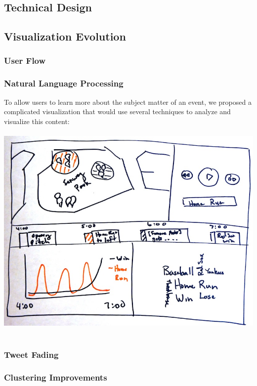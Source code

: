 \documentclass[pdftex,12pt,a4paper]{article}
\begin{document}
\subsection{Technical Design}

\subsection{Visualization Evolution}
\subsubsection{User Flow}

\subsubsection{Natural Language Processing}
To allow users to learn more about the subject matter of an event, we proposed a complicated visualization that would use several techniques to analyze and visualize this content: \\ \\
\includegraphics[width=5.5in]{pheme2.jpg} \\ \\

\subsubsection{Tweet Fading}

\subsubsection{Clustering Improvements}
\end{document}
